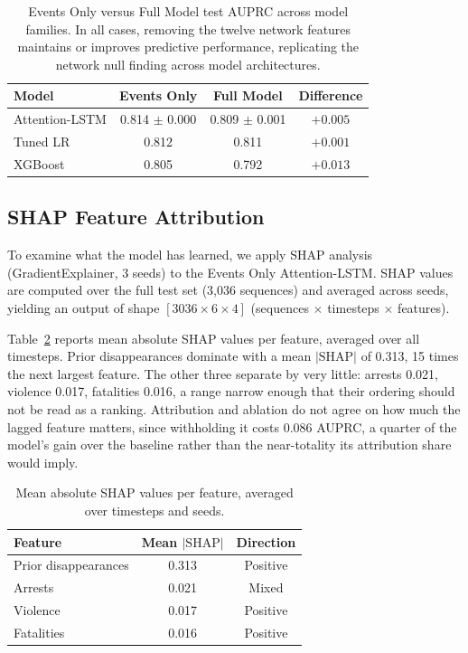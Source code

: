 \documentclass[pdflatex,sn-mathphys-num]{sn-jnl}%
\theoremstyle{thmstyleone}%
\theoremstyle{thmstyletwo}%
\theoremstyle{thmstylethree}%
\begin{document}
\begin{table}[h]
\centering
\caption{Events Only versus Full Model test AUPRC across model families. In all cases, removing the twelve network features maintains or improves predictive performance, replicating the network null finding across model architectures.}
\label{tab:events_only_comparison}
\small
\begin{tabular}{lccc}
\toprule
\textbf{Model} & \textbf{Events Only} & \textbf{Full Model} & \textbf{Difference} \\
\midrule
Attention-LSTM & 0.814 $\pm$ 0.000 & 0.809 $\pm$ 0.001 & $+0.005$ \\
Tuned LR & 0.812 & 0.811 & $+0.001$ \\
XGBoost & 0.805 & 0.792 & $+0.013$ \\
\bottomrule
\end{tabular}
\end{table}

\subsection{SHAP Feature Attribution}\label{sec:temporal_attribution}

To examine what the model has learned, we apply SHAP analysis (GradientExplainer, 3 seeds) to the Events Only Attention-LSTM. SHAP values are computed over the full test set (3,036 sequences) and averaged across seeds, yielding an output of shape $[3036 \times 6 \times 4]$ (sequences $\times$ timesteps $\times$ features).

Table~\ref{tab:shap_importance} reports mean absolute SHAP values per feature, averaged over all timesteps. Prior disappearances dominate with a mean $|\text{SHAP}|$ of 0.313, 15 times the next largest feature. The other three separate by very little: arrests 0.021, violence 0.017, fatalities 0.016, a range narrow enough that their ordering should not be read as a ranking. Attribution and ablation do not agree on how much the lagged feature matters, since withholding it costs 0.086 AUPRC, a quarter of the model's gain over the baseline rather than the near-totality its attribution share would imply.

\begin{table}[h]
\centering
\caption{Mean absolute SHAP values per feature, averaged over timesteps and seeds.}
\label{tab:shap_importance}
\small
\begin{tabular}{lcc}
\toprule
\textbf{Feature} & \textbf{Mean $|\text{SHAP}|$} & \textbf{Direction} \\
\midrule
Prior disappearances & 0.313 & Positive \\
Arrests              & 0.021 & Mixed \\
Violence             & 0.017 & Positive \\
Fatalities           & 0.016 & Positive \\
\bottomrule
\end{tabular}
\end{table}
\end{document}
